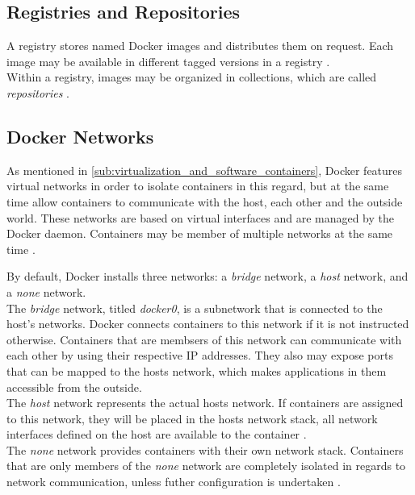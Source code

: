
  \subsection{Registries and Repositories} %
  \label{sub:registries_and_repositories}
    A registry stores named Docker images and distributes them on request. Each image may be available in different tagged versions in a registry \cite{Docker????Dockera}. \\
    Within a registry, images may be organized in collections, which are called \emph{repositories} \cite{Docker????Docker}.


  \subsection{Docker Networks} %
  \label{sub:docker_networks}
    As mentioned in \ref{sub:virtualization_and_software_containers}, Docker features virtual networks in order to isolate containers in this regard, but at the same time allow containers to communicate with the host, each other and the outside world. These networks are based on virtual interfaces and are managed by the Docker daemon. Containers may be member of multiple networks at the same time \cite{Docker????Dockera}.

    By default, Docker installs three networks: a \emph{bridge} network, a \emph{host} network, and a \emph{none} network. \\
    The \emph{bridge} network, titled \emph{docker0}, is a subnetwork that is connected to the host's networks. Docker connects containers to this network if it is not instructed otherwise. Containers that are membsers of this network can communicate with each other by using their respective IP addresses. They also may expose ports that can be mapped to the hosts network, which makes applications in them accessible from the outside. \\
    The \emph{host} network represents the actual hosts network. If containers are assigned to this network, they will be placed in the hosts network stack, \ie all network interfaces defined on the host are available to the container \cite{Docker????Dockera}. \\
    The \emph{none} network provides containers with their own network stack. Containers that are only members of the \emph{none} network are completely isolated in regards to network communication, unless futher configuration is undertaken \cite{Docker????Dockera}.

